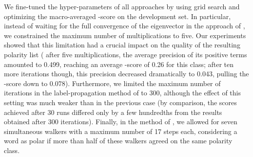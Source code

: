 We fine-tuned the hyper-parameters of all approaches by using grid
search and optimizing the macro-averaged \F{}-score on the development
set.  In particular, instead of waiting for the full convergence of
the eigenvector in the approach of \citet{Blair-Goldensohn:08},
we constrained the maximum number of multiplications to five.  Our
experiments showed that this limitation had a crucial impact on the
quality of the resulting polarity list (\eg{} after five
multiplications, the average precision of its positive terms amounted
to 0.499, reaching an average \F{}-score of 0.26 for this class; after
ten more iterations though, this precision decreased dramatically to
0.043, pulling the \F{}-score down to 0.078).  Furthermore, we limited
the maximum number of iterations in the label-propagation method of
\citet{Rao:09} to 300, although the effect of this setting was
much weaker than in the previous case (by comparison, the scores
achieved after 30 runs differed only by a few hundredths from the
results obtained after 300 iterations).  Finally, in the method of
\citet{Awadallah:10}, we allowed for seven simultaneous walkers
with a maximum number of 17 steps each, considering a word as polar if
more than half of these walkers agreed on the same polarity class.


